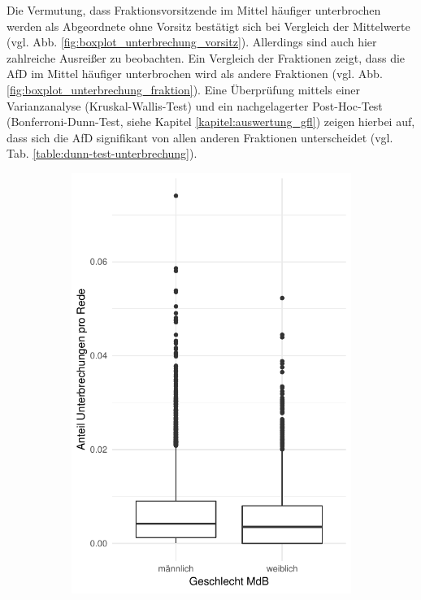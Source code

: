 \documentclass[12pt, 
    twoside=false, 
    bibliography=totoc, 
    numbers=endperiod, 
    headings=normal, 
    toc=chapterentrydotfill
    ]{scrbook}
\begin{document}
Die Vermutung, dass Fraktionsvorsitzende im Mittel häufiger unterbrochen werden als Abgeordnete ohne Vorsitz bestätigt sich bei Vergleich der Mittelwerte (vgl. Abb. \ref{fig:boxplot_unterbrechung_vorsitz}). Allerdings sind auch hier zahlreiche Ausreißer zu beobachten. Ein Vergleich der Fraktionen zeigt, dass die AfD im Mittel häufiger unterbrochen wird als andere Fraktionen (vgl. Abb. \ref{fig:boxplot_unterbrechung_fraktion}). Eine Überprüfung mittels einer Varianzanalyse (Kruskal-Wallis-Test) und ein nachgelagerter Post-Hoc-Test (Bonferroni-Dunn-Test, siehe Kapitel \ref{kapitel:auswertung_gfl}) zeigen hierbei auf, dass sich die AfD signifikant von allen anderen Fraktionen unterscheidet (vgl. Tab. \ref{table:dunn-test-unterbrechung}).

\begin{figure}[H]
    \centering
    \begin{subfigure}{.5\textwidth}
      \centering
      \includegraphics[width=.9\linewidth]{document/images/boxplot_unterbrechung_geschlecht.pdf}

\end{subfigure}
\end{figure}
\end{document}
